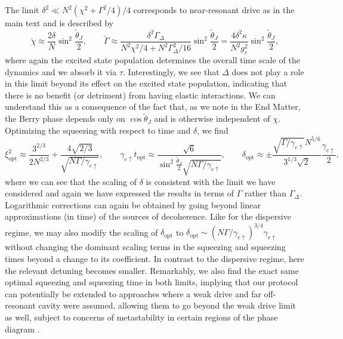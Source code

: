 The limit $\delta^2 \ll N^2 (\chi^2 + \Gamma^2/4)/4$ corresponds to near-resonant drive as in the main text and is described by
\begin{equation}
    \check{\chi} \approx  \frac{2 \delta }{N} \sin^2 \frac{\tilde{\theta}_J}{2}, \qquad \check{\Gamma} \approx \frac{\delta^2 \Gamma_\Delta}{N^2 \chi^2/4+N^2 \Gamma_\Delta^2/16} \sin^2 \frac{\tilde{\theta}_J}{2} = \frac{ 4 \delta^2 \kappa}{N^2 g_c^2} \sin^2 \frac{\tilde{\theta}_J}{2},
\end{equation}
where again the excited state population determines the overall time scale of the dynamics and we absorb it via $\tau$. 
Interestingly, we see that $\Delta$ does not play a role in this limit beyond its effect on the excited state population, indicating that there is no benefit (or detriment) from having elastic interactions. We can understand this as a consequence of the fact that, as we note in the End Matter, the Berry phase depends only on $\cos \tilde{\theta}_J$ and is otherwise independent of $\chi$. Optimizing the squeezing with respect to time and $\delta$, we find
\begin{equation}
    \xi^2_{\text{opt}} \approx  \frac{3^{2/3}}{2 N^{2/3}} + \frac{4 \sqrt{2/3}}{\sqrt{N \Gamma/\gamma_{e \uparrow}}} , \qquad \gamma_{e \uparrow} t_{\text{opt}} \approx \frac{\sqrt{6}}{ \sin^2 \frac{\tilde{\theta}_J}{2} \sqrt{N \Gamma/ \gamma_{e \uparrow}}}, \qquad \delta_{\text{opt}} \approx \pm \frac{\sqrt{\Gamma/\gamma_{e \uparrow}} N^{5/6}}{3^{1/3} \sqrt{2} } \frac{\gamma_{e \uparrow}}{2},
\end{equation}
where we can see that the scaling of $\delta$ is consistent with the limit we have considered and again we have expressed the results in terms of $\Gamma$ rather than $\Gamma_\Delta$. Logarithmic corrections can again be obtained by going beyond linear approximations (in time) of the sources of decoherence. Like for the dispersive regime, we may also modify the scaling of $\delta_{\text{opt}}$ to $\delta_{\text{opt}} \sim (N \Gamma/\gamma_{e \uparrow})^{3/4} \gamma_{e \uparrow}$ without changing the dominant scaling terms in the squeezing and squeezing times beyond a change to its coefficient. In contrast to the dispersive regime, here the relevant detuning becomes smaller. Remarkably, we also find the exact same optimal squeezing and squeezing time in both limits, implying that our protocol can potentially be extended to approaches where a weak drive and far off-resonant cavity were assumed, allowing them to go beyond the weak drive limit as well, subject to concerns of metastability in certain regions of the phase diagram \cite{Barberena2019}.

